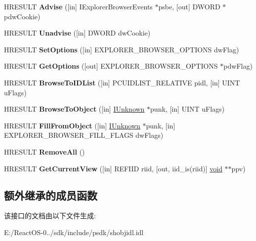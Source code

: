 \begin{DoxyCompactItemize}
H\+R\+E\+S\+U\+LT {\bfseries Advise} (\mbox{[}in\mbox{]} I\+Explorer\+Browser\+Events $\ast$psbe, \mbox{[}out\mbox{]} D\+W\+O\+RD $\ast$pdw\+Cookie)
\item 
\mbox{\label{interface_i_explorer_browser_a82a247682d8c05365acd975385a971b2}} 
H\+R\+E\+S\+U\+LT {\bfseries Unadvise} (\mbox{[}in\mbox{]} D\+W\+O\+RD dw\+Cookie)
\item 
\mbox{\label{interface_i_explorer_browser_ae17b9085edf86f6492220dcf8d2744f6}} 
H\+R\+E\+S\+U\+LT {\bfseries Set\+Options} (\mbox{[}in\mbox{]} E\+X\+P\+L\+O\+R\+E\+R\+\_\+\+B\+R\+O\+W\+S\+E\+R\+\_\+\+O\+P\+T\+I\+O\+NS dw\+Flag)
\item 
\mbox{\label{interface_i_explorer_browser_a14c6620eeaabe168a53301ba1077508d}} 
H\+R\+E\+S\+U\+LT {\bfseries Get\+Options} (\mbox{[}out\mbox{]} E\+X\+P\+L\+O\+R\+E\+R\+\_\+\+B\+R\+O\+W\+S\+E\+R\+\_\+\+O\+P\+T\+I\+O\+NS $\ast$pdw\+Flag)
\item 
\mbox{\label{interface_i_explorer_browser_a96472b550e968565eed9116d0d0fc0e4}} 
H\+R\+E\+S\+U\+LT {\bfseries Browse\+To\+I\+D\+List} (\mbox{[}in\mbox{]} P\+C\+U\+I\+D\+L\+I\+S\+T\+\_\+\+R\+E\+L\+A\+T\+I\+VE pidl, \mbox{[}in\mbox{]} U\+I\+NT u\+Flags)
\item 
\mbox{\label{interface_i_explorer_browser_a47aff73f516ceaa341bb8949da812683}} 
H\+R\+E\+S\+U\+LT {\bfseries Browse\+To\+Object} (\mbox{[}in\mbox{]} \hyperlink{interface_i_unknown}{I\+Unknown} $\ast$punk, \mbox{[}in\mbox{]} U\+I\+NT u\+Flags)
\item 
\mbox{\label{interface_i_explorer_browser_a07077e7de023a8539edad2990f060445}} 
H\+R\+E\+S\+U\+LT {\bfseries Fill\+From\+Object} (\mbox{[}in\mbox{]} \hyperlink{interface_i_unknown}{I\+Unknown} $\ast$punk, \mbox{[}in\mbox{]} E\+X\+P\+L\+O\+R\+E\+R\+\_\+\+B\+R\+O\+W\+S\+E\+R\+\_\+\+F\+I\+L\+L\+\_\+\+F\+L\+A\+GS dw\+Flags)
\item 
\mbox{\label{interface_i_explorer_browser_a0103050f39b4021dcda7df9290e3f63c}} 
H\+R\+E\+S\+U\+LT {\bfseries Remove\+All} ()
\item 
\mbox{\label{interface_i_explorer_browser_a6f248c31961c885b7ba295c2b10e9516}} 
H\+R\+E\+S\+U\+LT {\bfseries Get\+Current\+View} (\mbox{[}in\mbox{]} R\+E\+F\+I\+ID riid, \mbox{[}out, iid\+\_\+is(riid)\mbox{]} \hyperlink{interfacevoid}{void} $\ast$$\ast$ppv)
\end{DoxyCompactItemize}
\subsection*{额外继承的成员函数}


该接口的文档由以下文件生成\+:\begin{DoxyCompactItemize}
\item 
E\+:/\+React\+O\+S-\/0../sdk/include/psdk/shobjidl.\+idl\end{DoxyCompactItemize}
